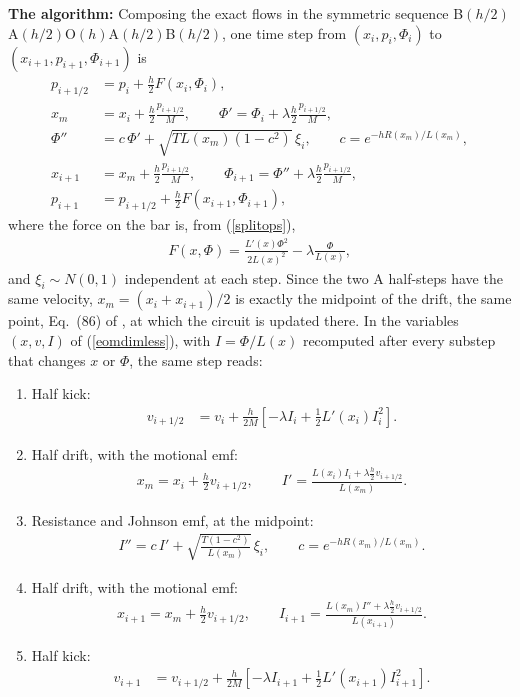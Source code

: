 \documentclass[11pt]{article}
\begin{document}
{\bf The algorithm:} Composing the exact flows in the symmetric sequence B$(h/2)$A$(h/2)$O$(h)$A$(h/2)$B$(h/2)$, one time step from $(x_i,p_i,\Phi_i)$ to $(x_{i+1},p_{i+1},\Phi_{i+1})$ is
\begin{align}
  p_{i+1/2}&=p_i+\frac{h}{2}F(x_i,\Phi_i),\nonumber\\
  x_m&=x_i+\frac{h}{2}\frac{p_{i+1/2}}{M},\qquad\Phi'=\Phi_i+\lambda\frac{h}{2}\frac{p_{i+1/2}}{M},\nonumber\\
  \Phi''&=c\,\Phi'+\sqrt{TL(x_m)(1-c^2)}\,\xi_i,\qquad c=e^{-hR(x_m)/L(x_m)},\nonumber\\
  x_{i+1}&=x_m+\frac{h}{2}\frac{p_{i+1/2}}{M},\qquad\Phi_{i+1}=\Phi''+\lambda\frac{h}{2}\frac{p_{i+1/2}}{M},\nonumber\\
  p_{i+1}&=p_{i+1/2}+\frac{h}{2}F(x_{i+1},\Phi_{i+1}),
  \label{algxpphi}
\end{align}
where the force on the bar is, from (\ref{splitops}),
\begin{align}
  F(x,\Phi)=\frac{L'(x)\Phi^2}{2L(x)^2}-\lambda\frac{\Phi}{L(x)},
  \label{forcexphi}
\end{align}
and $\xi_i\sim N(0,1)$ independent at each step. Since the two A half-steps have the same velocity, $x_m=(x_i+x_{i+1})/2$ is exactly the midpoint of the drift, the same point, Eq.~(86) of \cite{alvarez}, at which the circuit is updated there. In the variables $(x,v,I)$ of (\ref{eomdimless}), with $I=\Phi/L(x)$ recomputed after every substep that changes $x$ or $\Phi$, the same step reads:
\begin{enumerate}
\item Half kick:
  \begin{align}
    v_{i+1/2}&=v_i+\frac{h}{2M}\left[-\lambda I_i+\frac{1}{2}L'(x_i)I_i^2\right].
  \end{align}
\item Half drift, with the motional emf:
  \begin{align}
    x_m=x_i+\frac{h}{2}v_{i+1/2},\qquad I'=\frac{L(x_i)I_i+\lambda\frac{h}{2}v_{i+1/2}}{L(x_m)}.
  \end{align}
\item Resistance and Johnson emf, at the midpoint:
  \begin{align}
    I''=c\,I'+\sqrt{\frac{T(1-c^2)}{L(x_m)}}\,\xi_i,\qquad c=e^{-hR(x_m)/L(x_m)}.
  \end{align}
\item Half drift, with the motional emf:
  \begin{align}
    x_{i+1}=x_m+\frac{h}{2}v_{i+1/2},\qquad I_{i+1}=\frac{L(x_m)I''+\lambda\frac{h}{2}v_{i+1/2}}{L(x_{i+1})}.
  \end{align}
\item Half kick:
  \begin{align}
    v_{i+1}&=v_{i+1/2}+\frac{h}{2M}\left[-\lambda I_{i+1}+\frac{1}{2}L'(x_{i+1})I_{i+1}^2\right].
  \end{align}
\end{enumerate}
\end{document}
